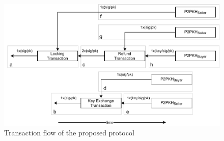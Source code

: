 \documentclass{cacthesis}
\newcounter{protocol}
\begin{document}
	    
	    
	    
	    \begin{figure}
            \begin{center}
                \includegraphics[width=\textwidth]{images/transaction_flow.pdf}
              \caption{Transaction flow of the proposed protocol}
              \label{fig:transactionFlow}
            \end{center}
        \end{figure}
	    
\end{document}
